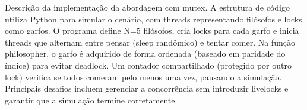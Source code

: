 Descrição da implementação da abordagem com mutex. A estrutura de código utiliza Python para simular o cenário, com threads representando filósofos e locks como garfos. O programa define N=5 filósofos, cria locks para cada garfo e inicia threads que alternam entre pensar (sleep randômico) e tentar comer. Na função philosopher, o garfo é adquirido de forma ordenada (baseado em paridade do índice) para evitar deadlock. Um contador compartilhado (protegido por outro lock) verifica se todos comeram pelo menos uma vez, pausando a simulação. Principais desafios incluem gerenciar a concorrência sem introduzir livelocks e garantir que a simulação termine corretamente.